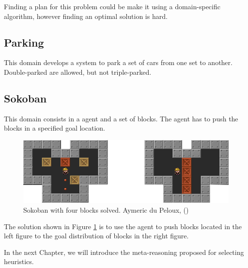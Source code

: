 Finding a plan for this problem could be make it using a domain-specific algorithm, however finding an optimal solution is hard.

\subsection{Parking}
This domain develops a system to park a set of cars from one set to another. Double-parked are allowed, but not triple-parked.

\subsection{Sokoban}
This domain consists in a agent and a set of blocks. The agent has to push the blocks in a specified goal location. 

\begin{figure}[!htb]
\begin{center}
  \includegraphics[width=12cm,scale=0.5]{images/sokoban_star_end}
\end{center}
\caption{Sokoban with four blocks solved. Aymeric du Peloux, (\citeyear{sokoban2010})}\label{fig:img_sokoban_solved}
\end{figure}

The solution shown in Figure \ref{fig:img_sokoban_solved} is to use the agent to push blocks located in the left figure to the goal distribution of blocks in the right figure.

\bigskip

In the next Chapter, we will introduce the meta-reasoning proposed for selecting heuristics.

\clearpage